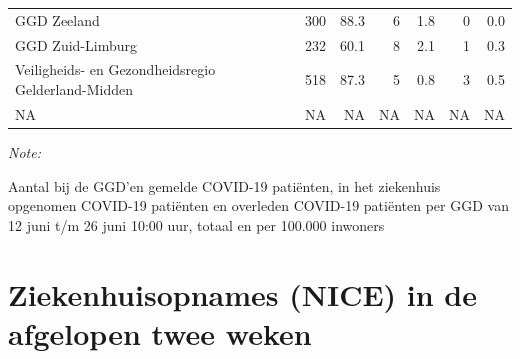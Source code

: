 \documentclass[
  english,
  man,floatsintext]{apa6}
\begin{document}
\begin{table}
\begin{threeparttable}
\begin{tabular}{lrrrrrr}
GGD Zeeland & 300 & 88.3 & 6 & 1.8 & 0 & 0.0\\
GGD Zuid-Limburg & 232 & 60.1 & 8 & 2.1 & 1 & 0.3\\
Veiligheids- en Gezondheidsregio Gelderland-Midden & 518 & 87.3 & 5 & 0.8 & 3 & 0.5\\
NA & NA & NA & NA & NA & NA & NA\\
\bottomrule
\end{tabular}
\begin{tablenotes}
\item \textit{Note: } 
\item Aantal bij de GGD’en gemelde COVID-19 patiënten, in het ziekenhuis opgenomen COVID-19 patiënten en overleden COVID-19 patiënten per GGD van 12 juni t/m 26 juni 10:00 uur, totaal en per 100.000 inwoners
\end{tablenotes}
\end{threeparttable}
\endgroup{}
\end{table}

\newpage

\hypertarget{ziekenhuisopnames-nice-in-de-afgelopen-twee-weken}{%
\section{Ziekenhuisopnames (NICE) in de afgelopen twee weken}\label{ziekenhuisopnames-nice-in-de-afgelopen-twee-weken}}
\end{document}
